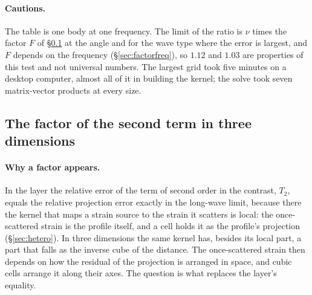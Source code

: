 \documentclass[11pt,a4paper]{article}
\begin{document}
\paragraph{Cautions.} The table is one body at one frequency. The limit of the ratio is $\nu$ times the
factor $F$ of \S\ref{sec:factor3d} at the angle and for the wave type where the error is largest, and $F$
depends on the frequency (\S\ref{sec:factorfreq}), so $1.12$ and $1.03$ are properties of this test and
not universal numbers. The largest grid took five minutes on a desktop computer, almost all of it in
building the kernel; the solve took seven matrix-vector products at every size.

\subsection{The factor of the second term in three dimensions}\label{sec:factor3d}

\paragraph{Why a factor appears.} In the layer the relative error of the term of second order in the
contrast, $T_2$, equals the relative projection error exactly in the long-wave limit, because there the
kernel that maps a strain source to the strain it scatters is local: the once-scattered strain is the
profile itself, and a cell holds it as the profile's projection (\S\ref{sec:hetero}). In three
dimensions the same kernel has, besides its local part, a part that falls as the inverse cube of the
distance. The once-scattered strain then depends on how the residual of the projection is arranged in
space, and cubic cells arrange it along their axes. The question is what replaces the
layer's equality.
\end{document}
